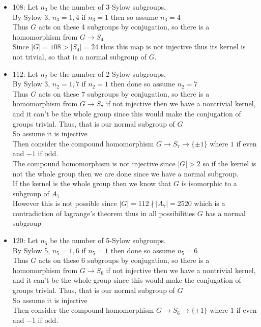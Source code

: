 \documentclass[12pt,letterpaper]{article}
\theoremstyle{definition}
\begin{document}
\begin{itemize}
    \item 108:
    Let $n_3$ be the number of 3-Sylow subgroups.\\
    By Sylow 3, $n_3=1,4$ if $n_3=1$ then so assume $n_3=4$\\
    Thus $G$ acts on these 4 subgroups by conjugation, so there is a homomorphism from $G \rightarrow S_4$\\
    Since $|G|=108 > |S_4|=24$ thus this map is not injective thus its kernel is not trivial, so that is a normal subgroup of $G$.
    \item 112:
    Let $n_2$ be the number of 2-Sylow subgroups.\\
    By Sylow 3, $n_2=1,7$ if $n_2=1$ then done so assume $n_2=7$\\
    Thus $G$ acts on these 7 subgroups by conjugation, so there is a homomorphism from $G \rightarrow S_7$ if not injective then we have a nontrivial kernel, and it can't be the whole group since this would make the conjugation of groups trivial. Thus, that is our normal subgroup of $G$\\
    So assume it is injective\\
    Then consider the compound homomorphism $G \rightarrow S_7 \rightarrow \{\pm 1\}$ where $1$ if even and $-1$ if odd.\\
    The compound homomorphism is not injective since $|G|>2$ so if the kernel is not the whole group then we are done since we have a normal subgroup.\\
    If the kernel is the whole group then we know that $G$ is isomorphic to a subgroup of $A_7$\\
    However this is not possible since $|G|=112 \nmid |A_7|=2520$ which is a contradiction of lagrange's theorem thus in all possibilities $G$ has a normal subgroup
    \item 120:
    Let $n_5$ be the number of 5-Sylow subgroups.\\
    By Sylow 5, $n_5=1,6$ if $n_5=1$ then done so assume $n_5=6$\\
    Thus $G$ acts on these 6 subgroups by conjugation, so there is a homomorphism from $G \rightarrow S_6$ if not injective then we have a nontrivial kernel, and it can't be the whole group since this would make the conjugation of groups trivial. Thus, that is our normal subgroup of $G$\\
    So assume it is injective\\
    Then consider the compound homomorphism $G \rightarrow S_6 \rightarrow \{\pm 1\}$ where $1$ if even and $-1$ if odd.\\

\end{itemize}
\end{document}

